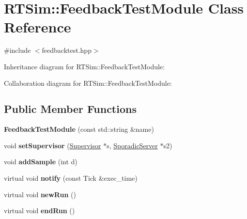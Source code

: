 \hypertarget{classRTSim_1_1FeedbackTestModule}{}\section{R\+T\+Sim\+:\+:Feedback\+Test\+Module Class Reference}
\label{classRTSim_1_1FeedbackTestModule}


{\ttfamily \#include $<$feedbacktest.\+hpp$>$}



Inheritance diagram for R\+T\+Sim\+:\+:Feedback\+Test\+Module\+:


Collaboration diagram for R\+T\+Sim\+:\+:Feedback\+Test\+Module\+:
\subsection*{Public Member Functions}
\begin{DoxyCompactItemize}
\item 
{\bfseries Feedback\+Test\+Module} (const std\+::string \&name)\hypertarget{classRTSim_1_1FeedbackTestModule_acf5d8bf2391921d3ed50088c9397b773}{}\label{classRTSim_1_1FeedbackTestModule_acf5d8bf2391921d3ed50088c9397b773}

\item 
void {\bfseries set\+Supervisor} (\hyperlink{classRTSim_1_1Supervisor}{Supervisor} $\ast$s, \hyperlink{classRTSim_1_1SporadicServer}{Sporadic\+Server} $\ast$s2)\hypertarget{classRTSim_1_1FeedbackTestModule_a8670fff2964f5e0de3817c4ac5a25aaf}{}\label{classRTSim_1_1FeedbackTestModule_a8670fff2964f5e0de3817c4ac5a25aaf}

\item 
void {\bfseries add\+Sample} (int d)\hypertarget{classRTSim_1_1FeedbackTestModule_a6477dc032f01613665d8be3da1519684}{}\label{classRTSim_1_1FeedbackTestModule_a6477dc032f01613665d8be3da1519684}

\item 
virtual void {\bfseries notify} (const Tick \&exec\+\_\+time)\hypertarget{classRTSim_1_1FeedbackTestModule_a2d42a9067c26675e919ae0c9b0499b56}{}\label{classRTSim_1_1FeedbackTestModule_a2d42a9067c26675e919ae0c9b0499b56}

\item 
virtual void {\bfseries new\+Run} ()\hypertarget{classRTSim_1_1FeedbackTestModule_abc8e37402b5668896896e2c7b75de457}{}\label{classRTSim_1_1FeedbackTestModule_abc8e37402b5668896896e2c7b75de457}

\item 
virtual void {\bfseries end\+Run} ()\hypertarget{classRTSim_1_1FeedbackTestModule_ac5ef8484bdccc0ef2ec956bcf166faf3}{}\label{classRTSim_1_1FeedbackTestModule_ac5ef8484bdccc0ef2ec956bcf166faf3}

\end{DoxyCompactItemize}
